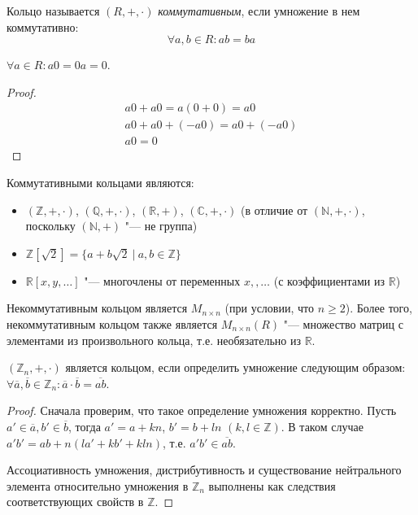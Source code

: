 \begin{definition}
	Кольцо называется $(R, +, \cdot)$ \textit{коммутативным}, если умножение в нем коммутативно:
	\[\forall a, b \in R: ab = ba\]
\end{definition}

\begin{proposition}
	$\forall a \in R: a0 = 0a = 0$.
\end{proposition}

\begin{proof}
	\begin{gather*}
	a0 + a0 = a(0 + 0) = a0\\
	a0 + a0 + (-a0) = a0 + (-a0)\\
	a0 = 0
	\end{gather*}
\end{proof}

\begin{example}
	Коммутативными кольцами являются:
	\begin{itemize}
		\item $(\mathbb{Z}, +, \cdot)$, $(\mathbb{Q}, +, \cdot)$, $(\mathbb{R}, +)$, $(\mathbb{C}, +, \cdot)$ (в отличие от $(\mathbb{N}, +, \cdot)$, поскольку $(\mathbb{N}, +)$ "--- не группа)
		\item $\mathbb{Z}[\sqrt{2}] = \{a + b\sqrt{2}~|~a, b \in \mathbb{Z}\}$
		\item $\mathbb{R}[x, y, \dots]$ "--- многочлены от переменных $x, , \dots$ (с коэффициентами из $\mathbb{R}$)
	\end{itemize}
\end{example}

\begin{example}
	Некоммутативным кольцом является $M_{n \times n}$ (при условии, что $n \ge 2$). Более того, некоммутативным кольцом также является $M_{n \times n}(R)$ "--- множество матриц с элементами из произвольного кольца, т.\:е. необязательно из $\mathbb{R}$.
\end{example}

\begin{proposition}
	$(\mathbb{Z}_n, +, \cdot)$ является кольцом, если определить умножение следующим образом: $\forall \overline{a}, \overline{b} \in \mathbb{Z}_n: \overline{a}\cdot\overline{b} = \overline{ab}$.
\end{proposition}

\begin{proof}
	Сначала проверим, что такое определение умножения корректно. Пусть $a' \in \overline{a}, b' \in \overline{b}$, тогда $a' = a + kn$, $b' = b + ln$ $(k, l \in \mathbb{Z})$. В таком случае $a'b' = ab + n(la' + kb' + kln)$, т.\:е. $a'b' \in \overline{ab}$.
	
	Ассоциативность умножения, дистрибутивность и существование нейтрального элемента относительно умножения в $\mathbb{Z}_n$ выполнены как следствия соответствующих свойств в $\mathbb{Z}$.
\end{proof}

